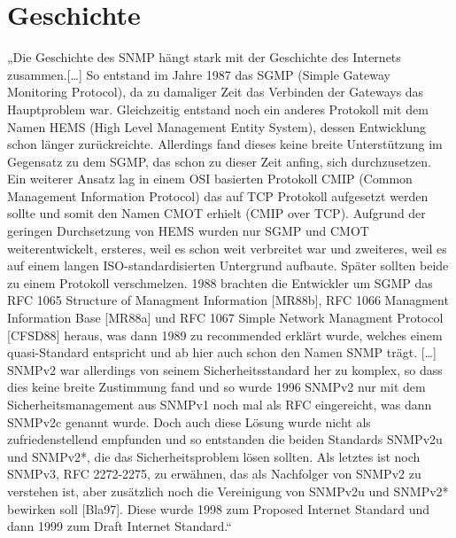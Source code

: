 \documentclass[11pt,a4paper]{article}
\begin{document}
\section*{Geschichte}
„Die Geschichte des SNMP hängt stark mit der Geschichte des Internets zusammen.[…]
So entstand im Jahre 1987 das SGMP (Simple Gateway Monitoring Protocol), da zu damaliger Zeit das Verbinden der Gateways das Hauptproblem war. Gleichzeitig entstand noch ein anderes Protokoll mit dem Namen HEMS (High Level Management Entity System), dessen Entwicklung schon länger zurückreichte. Allerdings fand dieses keine breite Unterstützung im Gegensatz zu dem SGMP, das schon zu dieser Zeit anfing, sich durchzusetzen. Ein weiterer Ansatz lag in einem OSI basierten Protokoll CMIP (Common Management Information Protocol) das auf TCP Protokoll aufgesetzt werden sollte und somit den Namen CMOT erhielt (CMIP over TCP). Aufgrund der geringen Durchsetzung von HEMS wurden nur SGMP und CMOT weiterentwickelt, ersteres, weil es schon weit verbreitet war und zweiteres, weil es auf einem langen ISO-standardisierten Untergrund aufbaute. Später sollten beide zu einem Protokoll verschmelzen.
1988 brachten die Entwickler um SGMP das RFC 1065 Structure of Managment Information [MR88b], RFC 1066 Managment Information Base [MR88a] und RFC 1067 Simple Network Managment Protocol [CFSD88] heraus, was dann 1989 zu recommended erklärt wurde, welches einem quasi-Standard entspricht und ab hier auch schon den Namen SNMP trägt. […]
SNMPv2 war allerdings von seinem Sicherheitsstandard her zu komplex, so dass dies keine breite Zustimmung fand und so wurde 1996 SNMPv2 nur mit dem Sicherheitsmanagement aus SNMPv1 noch mal als RFC eingereicht, was dann SNMPv2c genannt wurde. Doch auch diese Lösung wurde nicht als zufriedenstellend empfunden und so entstanden die beiden Standards SNMPv2u und SNMPv2*, die das Sicherheitsproblem lösen sollten.
Als letztes ist noch SNMPv3, RFC 2272-2275, zu erwähnen, das als Nachfolger von SNMPv2 zu verstehen ist, aber zusätzlich noch die Vereinigung von SNMPv2u und SNMPv2* bewirken soll [Bla97]. Diese wurde 1998 zum Proposed Internet Standard und dann 1999 zum Draft Internet Standard.“
\cite{history}
\pagebreak

\end{document}
